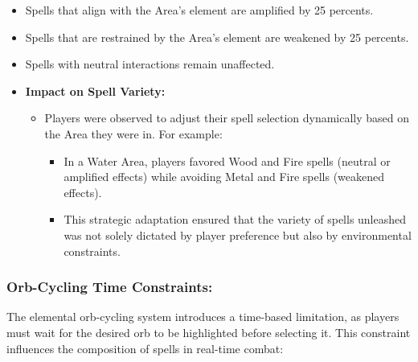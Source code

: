 \documentclass[10pt,twocolumn]{article}
\begin{document}
\begin{itemize}
    \item Spells that align with the Area's element are amplified by 25 percents.
    \item Spells that are restrained by the Area's element are weakened by 25 percents.
    \item Spells with neutral interactions remain unaffected.
    \item \textbf{Impact on Spell Variety:}
    \begin{itemize}
        \item Players were observed to adjust their spell selection dynamically based on the Area they were in. For example:
        \begin{itemize}
            \item In a Water Area, players favored Wood and Fire spells (neutral or amplified effects) while avoiding Metal and Fire spells (weakened effects).
            \item This strategic adaptation ensured that the variety of spells unleashed was not solely dictated by player preference but also by environmental constraints.
        \end{itemize}
    \end{itemize}
\end{itemize}

\subsubsection{Orb-Cycling Time Constraints:}
The elemental orb-cycling system introduces a time-based limitation, as players must wait for the desired orb to be highlighted before selecting it. This constraint influences the composition of spells in real-time combat:
\end{document}
